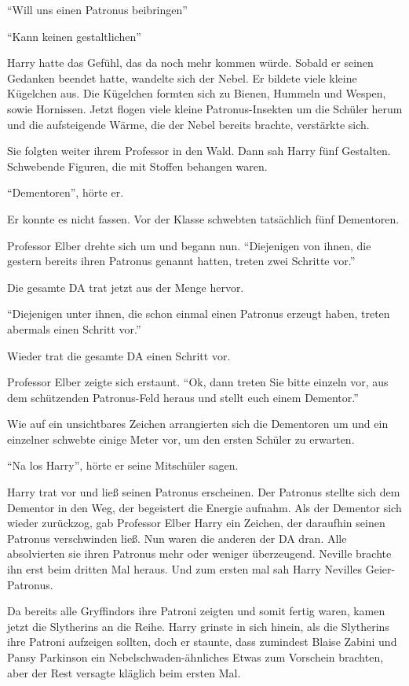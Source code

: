 \enquote{Will uns einen Patronus beibringen\abs}

\enquote{Kann keinen gestaltlichen\abs}

Harry hatte das Gefühl, das da noch mehr kommen würde. Sobald er seinen Gedanken beendet hatte, wandelte sich der Nebel. Er bildete viele kleine Kügelchen aus. Die Kügelchen formten sich zu Bienen, Hummeln und Wespen, sowie Hornissen. Jetzt flogen viele kleine Patronus-Insekten um die Schüler herum und die aufsteigende Wärme, die der Nebel bereits brachte, verstärkte sich.

Sie folgten weiter ihrem Professor in den Wald. Dann sah Harry fünf Gestalten. Schwebende Figuren, die mit Stoffen behangen waren.

\enquote{Dementoren}, hörte er.

Er konnte es nicht fassen. Vor der Klasse schwebten tatsächlich fünf Dementoren.

Professor Elber drehte sich um und begann nun. \enquote{Diejenigen von ihnen, die gestern bereits ihren Patronus genannt hatten, treten zwei Schritte vor.}

Die gesamte DA trat jetzt aus der Menge hervor.

\enquote{Diejenigen unter ihnen, die schon einmal einen Patronus erzeugt haben, treten abermals einen Schritt vor.}

Wieder trat die gesamte DA einen Schritt vor.

Professor Elber zeigte sich erstaunt. \enquote{Ok, dann treten Sie bitte einzeln vor, aus dem schützenden Patronus-Feld heraus und stellt euch einem Dementor.}

Wie auf ein unsichtbares Zeichen arrangierten sich die Dementoren um und ein einzelner schwebte einige Meter vor, um den ersten Schüler zu erwarten.

\enquote{Na los Harry}, hörte er seine Mitschüler sagen.

Harry trat vor und ließ seinen Patronus erscheinen.  Der Patronus stellte sich dem Dementor in den Weg, der begeistert die Energie aufnahm. Als der Dementor sich wieder zurückzog, gab Professor Elber Harry ein Zeichen, der daraufhin seinen Patronus verschwinden ließ. Nun waren die anderen der DA dran. Alle absolvierten sie ihren Patronus mehr oder weniger überzeugend. Neville brachte ihn erst beim dritten Mal heraus. Und zum ersten mal sah Harry Nevilles Geier-Patronus.

Da bereits alle Gryffindors ihre Patroni zeigten und somit fertig waren, kamen jetzt die Slytherins an die Reihe. Harry grinste in sich hinein, als die Slytherins ihre Patroni aufzeigen sollten, doch er staunte, dass zumindest Blaise Zabini und Pansy Parkinson  ein Nebelschwaden-ähnliches Etwas zum Vorschein brachten, aber der Rest versagte kläglich beim ersten Mal.

